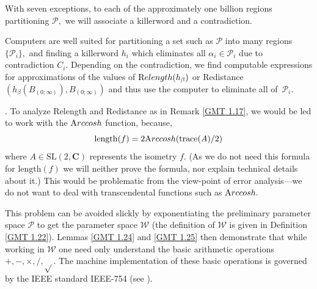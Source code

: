 \begin{summary}  \label{GMT 1.19} With seven exceptions,  to each of the approximately one
billion regions partitioning $\mathcal {P},$ we will
associate a killerword and a contradiction.  \end{summary} 

\begin{remark}  \label{GMT 1.20} Computers are well suited for partitioning a set such as $\mathcal {P}$
into many regions $\{ \mathcal {P}_i \},$ and finding a
killerword $h_i$ which eliminates all $\alpha_i \in \mathcal {P}_i $ due to contradiction $C_i.$
Depending on the contradiction, we find
computable expressions  for approximations of the values of
${\textrm Relength}(h_\beta)$ or Redistance$(h_\beta(B_{(0;\infty)}), B_{(0;\infty)})$ and
thus use the computer to eliminate all of~$\mathcal {P}_i .$ 
\end{remark}

\begin{remark}\label{GMT 1.21}.
	To analyze Relength and Redistance as in Remark \ref{GMT 1.17}, we would be led to work with the ${\textrm Arccosh}$ function, because, 
$$\mathrm {length}(f) = 2{\textrm Arccosh}(\mathrm {trace}(A)/2)$$
where $A\in \mathrm {SL}(2,\mathbf {C})$ represents the isometry $f.$
(As we do not need this formula for $\mathrm {length}(f)$ we will neither prove the formula, nor explain technical details about it.)  This would be problematic from the view-point of error analysis---we do not want to deal with transcendental functions such as ${\textrm Arccosh}.$  

This problem can be  avoided slickly by exponentiating the preliminary parameter space $\mathcal {P}$ to get the parameter space $\mathcal {W}$ (the
	definition of $\mathcal {W}$ is given in Definition \ref{GMT 1.22}).   Lemmas \ref{GMT 1.24} and \ref{GMT 1.25} then demonstrate
that while working in $\mathcal {W}$ one need only
understand the basic arithmetic operations $+, -, \times, /, \sqrt{}$.
The machine implementation of these basic operations is governed by the IEEE standard IEEE-754 (see \cite{IEEE}).
\end{remark}

